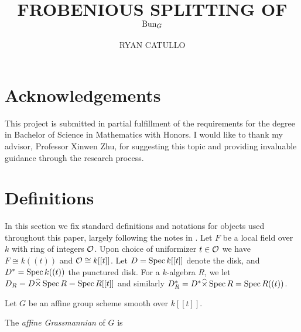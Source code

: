 \documentclass[12pt]{article}
\title{\large\bfseries{FROBENIOUS SPLITTING OF $\operatorname{Bun}_G$}}
\author{\normalsize{RYAN CATULLO}}
\date{}
\begin{document}
\maketitle
\abstract{\lipsum[1-1]}

\tableofcontents

\vspace{4em}
\pagestyle{fancy}

\section*{Acknowledgements}
This project is submitted in partial fulfillment of the requirements for the degree in Bachelor of Science in Mathematics with Honors. I would like to thank my advisor, Professor Xinwen Zhu, for suggesting this topic and providing invaluable guidance through the research process. 

\section{Definitions}
In this section we fix standard definitions and notations for objects used throughout this paper, largely following the notes in \cite{zhu}. Let $F$ be a local field over $k$ with ring of integers $\mathcal{O}$. Upon choice of uniformizer $t \in \mathcal{O}$ we have $F \cong k((t))$ and $\mathcal{O} \cong k[[t]]$. Let $D = \operatorname{Spec} k[[t]]$ denote the disk, and $D^* = \operatorname{Spec} k((t))$ the punctured disk. For a $k$-algebra $R$, we let $D_R = D \widehat{\times} \operatorname{Spec} R = \operatorname{Spec} R[[t]]$ and similarly $D^*_R = D^* \widehat{\times} \operatorname{Spec} R = \operatorname{Spec} R((t))$.

Let $G$ be an affine group scheme smooth over $k[[t]]$. 
\begin{defn}
    The \textit{affine Grassmannian} of $G$ is 
\end{defn}


\printbibliography
\end{document}
